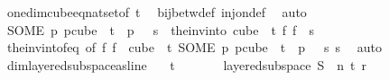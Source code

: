 \begin{isabellebody}
\ one{\isacharunderscore}{\kern0pt}dim{\isacharunderscore}{\kern0pt}cube{\isacharunderscore}{\kern0pt}eq{\isacharunderscore}{\kern0pt}nat{\isacharunderscore}{\kern0pt}set{\isacharbrackleft}{\kern0pt}of\ t{\isacharbrackright}{\kern0pt}\ \isamarkupfalse%
\ bij{\isacharunderscore}{\kern0pt}betw{\isacharunderscore}{\kern0pt}def\ inj{\isacharunderscore}{\kern0pt}on{\isacharunderscore}{\kern0pt}def\ \isamarkupfalse%
\ auto\ \isanewline
\ \ \isamarkupfalse%
\ \isamarkupfalse%
\ {\isachardoublequoteopen}{\isacharparenleft}{\kern0pt}SOME\ p{\isachardot}{\kern0pt}\ p{\isasymin}cube\ {}\ {\isacharparenleft}{\kern0pt}t{\isacharplus}{\kern0pt}{}{\isacharparenright}{\kern0pt}\ {\isasymand}\ p\ {}\ {\isacharequal}{\kern0pt}\ s{\isacharparenright}{\kern0pt}\ {\isacharequal}{\kern0pt}\ {\isacharparenleft}{\kern0pt}the{\isacharunderscore}{\kern0pt}inv{\isacharunderscore}{\kern0pt}into\ {\isacharparenleft}{\kern0pt}cube\ {}\ t{\isacharparenright}{\kern0pt}\ {\isacharparenleft}{\kern0pt}{\isasymlambda}f{\isachardot}{\kern0pt}\ f\ {}{\isacharparenright}{\kern0pt}\ s{\isacharparenright}{\kern0pt}{\isachardoublequoteclose}\ \isamarkupfalse%
\ the{\isacharunderscore}{\kern0pt}inv{\isacharunderscore}{\kern0pt}into{\isacharunderscore}{\kern0pt}f{\isacharunderscore}{\kern0pt}eq\ {\isacharbrackleft}{\kern0pt}of\ {\isachardoublequoteopen}{\isasymlambda}f{\isachardot}{\kern0pt}\ f\ {}{\isachardoublequoteclose}\ {\isachardoublequoteopen}cube\ {}\ t{\isachardoublequoteclose}\ {\isachardoublequoteopen}{\isacharparenleft}{\kern0pt}SOME\ p{\isachardot}{\kern0pt}\ p{\isasymin}cube\ {}\ {\isacharparenleft}{\kern0pt}t{\isacharplus}{\kern0pt}{}{\isacharparenright}{\kern0pt}\ {\isasymand}\ p\ {}\ {\isacharequal}{\kern0pt}\ s{\isacharparenright}{\kern0pt}{\isachardoublequoteclose}\ s{\isacharbrackright}{\kern0pt}\ \isamarkupfalse%
\ auto\isanewline
{}\isamarkupfalse%
%
\endisatagproof
{\isafoldproof}%
%
\isadelimproof
\isanewline
%
\endisadelimproof
\isanewline
{}\isamarkupfalse%
\ dim{}{\isacharunderscore}{\kern0pt}layered{\isacharunderscore}{\kern0pt}subspace{\isacharunderscore}{\kern0pt}as{\isacharunderscore}{\kern0pt}line{\isacharcolon}{\kern0pt}\isanewline
\ \ \ {\isachardoublequoteopen}t\ {\isachargreater}{\kern0pt}\ {}{\isachardoublequoteclose}\isanewline
\ \ \ \ \ {\isachardoublequoteopen}layered{\isacharunderscore}{\kern0pt}subspace\ S\ {}\ n\ t\ r\ {\isasymchi}{\isachardoublequoteclose}\isanewline

\end{isabellebody}
